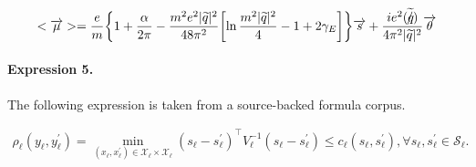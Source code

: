 \documentclass[11pt]{article}
\begin{document}
\begin{align*}<\overrightarrow{\mu}>=\frac{e}{m}\biggl\{1+\frac{\alpha}{2\pi}-\frac{m^{2}e^{2}|\widetilde{q}|^{2} }{48\pi^{2}}\biggl[\ln\frac{m^{2}|\widetilde{q}|^{2}}{4}-1+2\gamma_{E}\biggr]\biggr\}\overrightarrow{s}+\frac{ie^{2}(\widetilde{q\hspace{-0.2cm}/})}{4\pi^{2}|\widetilde{q}|^{2}}\overrightarrow{\theta}\end{align*}

\paragraph{Expression 5.} The following expression is taken from a source-backed formula corpus.

\begin{align*}\rho_\ell (y_\ell, y_\ell^\prime) = \min_{(x_\ell, x^\prime_\ell) \in \mathcal{X}_\ell \times \mathcal{X}_\ell } \left(s_{\ell}-s_{\ell}^{\prime}\right)^{\top} V_{\ell}^{-1}\left(s_{\ell}-s_{\ell}^{\prime}\right) \leq c_\ell(s_\ell, s_\ell^\prime), \forall s_\ell, s_\ell^\prime \in \mathcal{S}_\ell.\end{align*}
\end{document}

